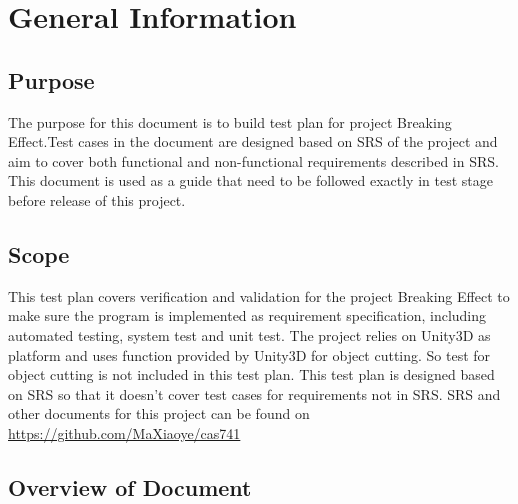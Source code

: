 \documentclass[12pt, titlepage]{article}
\begin{document}
	
	\newpage
	
	\tableofcontents
	
	\listoftables
	
	
	\newpage
	
	
	\section{General Information}
	
	\subsection{Purpose}
	
	The purpose for this document is to build test plan for project Breaking
	Effect.Test cases in the document are designed based on SRS of the project and
	aim to cover both functional and non-functional requirements described in SRS.
	This document is used as a guide that need to be followed exactly in test stage before release of this project. 
	
	\subsection{Scope}
	This test plan covers verification and validation for the project Breaking Effect to make sure the program is implemented as requirement specification, including automated testing, system test and unit test. The project relies on Unity3D as platform and uses function provided by Unity3D for object cutting. So test for object cutting is not included in this test plan. This test plan is designed based on SRS so that it doesn't cover test cases for requirements not in SRS. SRS and other documents for this project can be found on \url{https://github.com/MaXiaoye/cas741}
	
	\subsection{Overview of Document}
	
\end{document}
